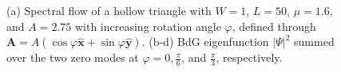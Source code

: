 \documentclass[aps,prb,showpacs,amsmath,twocolumn,amssymb,superscriptaddress]{revtex4-2}
\let\oldhat\hat
\renewcommand{\hat}[1]{\oldhat{\mathbf{#1}}}
\begin{document}
\begin{figure}[ht]
  \hspace{-20pt}
  \hspace{-20pt}
  \caption{(a) Spectral flow of a hollow triangle with $W=1$, $L=50$, $\mu=1.6$, and $A=2.75$ with increasing rotation angle $\varphi$, defined through $\mathbf A = A(\cos\varphi \hat{x} + \sin\varphi \hat{y})$. (b-d) BdG eigenfunction $|\Psi|^2$ summed over the two zero modes at $\varphi = 0, \frac{\pi}{6}$, and $\frac{\pi}{3}$, respectively.}
  \label{fig: rotation}
\end{figure}
\end{document}
